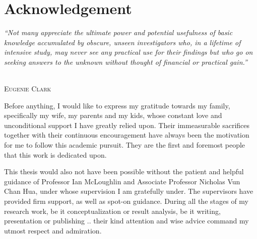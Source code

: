 


\section*{Acknowledgement} %
\pagestyle{empty} %

\epigraph{\textit{``Not many appreciate the ultimate power and potential usefulness of basic knowledge accumulated by obscure, unseen investigators who, in a lifetime of intensive study, may never see any practical use for their findings but who go on seeking answers to the unknown without thought of financial or practical gain.''}}%
{\textit{}\\ \textsc{Eugenie Clark}}

\onehalfspacing

Before anything, I would like to express my gratitude towards my family, specifically my wife, my parents and my kids,
  whose constant love and unconditional support I have greatly relied upon. 
Their immeasurable sacrifices together with their continuous encouragement have always been the motivation for me to follow this academic pursuit.
They are the first and foremost people that this work is dedicated upon.

This thesis would also not have been possible without the patient and helpful guidance of Professor Ian McLoughlin and Associate Professor Nicholas Vun Chan Hua, 
	under whose supervision I am gratefully under. 
The supervisors have provided firm support, as well as spot-on guidance. 
During all the stages of my research work, 
	be it conceptualization or result analysis, be it writing, presentation or publishing ..
	their kind attention and wise advice command my utmost respect and admiration.


